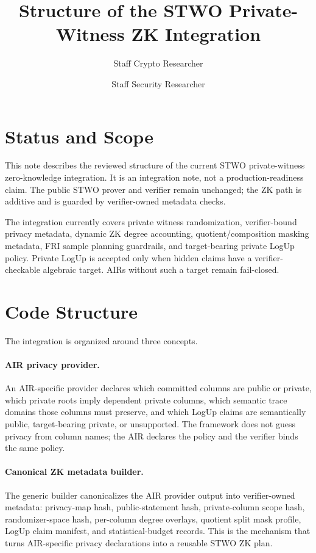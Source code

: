 \documentclass[11pt]{article}
\title{Structure of the STWO Private-Witness ZK Integration}
\author{Staff Crypto Researcher \and Staff Security Researcher}
\date{}
\begin{document}
\maketitle

\section{Status and Scope}

This note describes the reviewed structure of the current STWO private-witness
zero-knowledge integration. It is an integration note, not a production-readiness
claim. The public STWO prover and verifier remain unchanged; the ZK path is
additive and is guarded by verifier-owned metadata checks.

The integration currently covers private witness randomization, verifier-bound
privacy metadata, dynamic ZK degree accounting, quotient/composition masking
metadata, FRI sample planning guardrails, and target-bearing private LogUp policy.
Private LogUp is accepted only when hidden claims have a verifier-checkable
algebraic target. AIRs without such a target remain fail-closed.

\section{Code Structure}

The integration is organized around three concepts.

\paragraph{AIR privacy provider.}
An AIR-specific provider declares which committed columns are public or private,
which private roots imply dependent private columns, which semantic trace domains
those columns must preserve, and which LogUp claims are semantically public,
target-bearing private, or unsupported. The framework does not guess privacy from
column names; the AIR declares the policy and the verifier binds the same policy.

\paragraph{Canonical ZK metadata builder.}
The generic builder canonicalizes the AIR provider output into verifier-owned
metadata: privacy-map hash, public-statement hash, private-column scope hash,
randomizer-space hash, per-column degree overlays, quotient split mask profile,
LogUp claim manifest, and statistical-budget records. This is the mechanism that
turns AIR-specific privacy declarations into a reusable STWO ZK plan.
\end{document}
